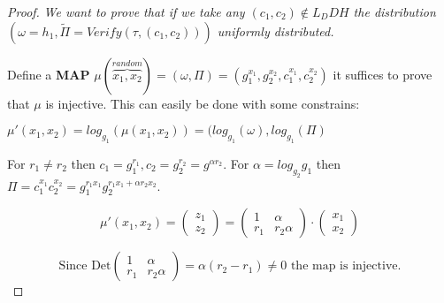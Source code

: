 \begin{proof}

    \textit{We want to prove that if we take any $(c_1,c_2)\notin L_DDH$ the distribution $(\omega=h_1, \widetilde{\Pi}=Verify(\tau,(c_1,c_2)))$ uniformly distributed.}

    Define a \textbf{MAP} $\mu(\overbrace{x_1,x_2}^{random})=(\omega,\Pi)=(g_1^{x_1},g_2^{x_2},c_1^{x_1},c_2^{x_2})$ it suffices to prove that $\mu$ is injective. This can easily be done with some constrains:

    $\mu'(x_1,x_2)=log_{g_1}(\mu(x_1,x_2))=(log_{g_1}(\omega),log_{g_1}(\Pi)$

    For $r_1\neq r_2$ then $c_1=g_1^{r_1},c_2=g_2^{r_2}=g^{\alpha r_2}$. For $\alpha=log_{g_2}g_1$ then $\Pi=c_1^{x_1}c_2^{x_2}=g_1^{r_1x_1}g_2^{r_1x_1+\alpha r_2x_2}$.
    
    \[\mu'(x_1,x_2)=
        \begin{pmatrix}
            z_1\\
            z_2
        \end{pmatrix}
        =
        \begin{pmatrix}
            1 & \alpha \\
            r_1 & r_2\alpha 
        \end{pmatrix}
        \cdot
        \begin{pmatrix}
            x_1\\
            x_2
        \end{pmatrix}
    \]

    \[ \text{Since Det}
    \begin{pmatrix}
        1 & \alpha \\
        r_1 & r_2\alpha 
    \end{pmatrix}=
    \alpha(r_2-r_1)\neq 0
    \text{ the map is injective.}
    \] 

\end{proof}

